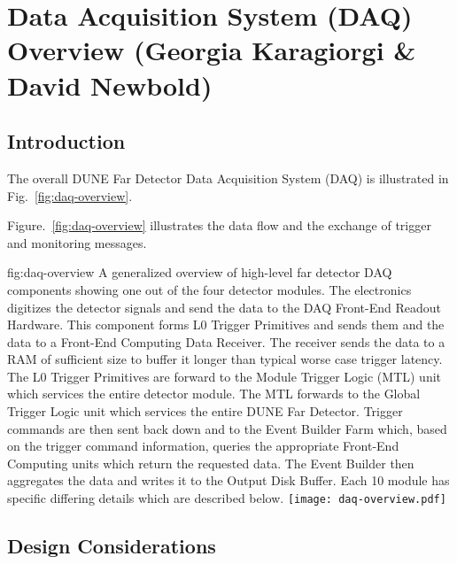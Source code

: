 \section{Data Acquisition System (DAQ) Overview (Georgia Karagiorgi \& David Newbold)}
\label{sec:fdsp-daq-ov}


\subsection{Introduction}
\label{sec:fdsp-daq-intro}

The overall DUNE Far Detector Data Acquisition System (DAQ) is
illustrated in Fig.~\ref{fig:daq-overview}.

Figure.~\ref{fig:daq-overview} illustrates the data flow and the
exchange of trigger and monitoring messages.



\begin{dunefigure}{fig:daq-overview}
  {A generalized overview of high-level far detector DAQ components showing one out of the four detector modules.  The electronics digitizes the detector signals and send the data to the DAQ Front-End Readout Hardware.  This component forms L0 Trigger Primitives and sends them and the data to a Front-End Computing Data Receiver.  The receiver sends the data to a RAM of sufficient size to buffer it longer than typical worse case trigger latency.  The L0 Trigger Primitives are forward to the Module Trigger Logic (MTL) unit which services the entire detector module.  The MTL forwards to the Global Trigger Logic unit which services the entire DUNE Far Detector.  Trigger commands are then sent back down and to the Event Builder Farm which, based on the trigger command information, queries the appropriate Front-End Computing units which return the requested data.  The Event Builder then aggregates the data and writes it to the Output Disk Buffer.  Each \SI{10}{\kton} module has specific differing details which are described below.}
\texttt{[image: daq-overview.pdf]}%
\end{dunefigure}



\subsection{Design Considerations}
\label{sec:fdsp-daq-des-consid}


